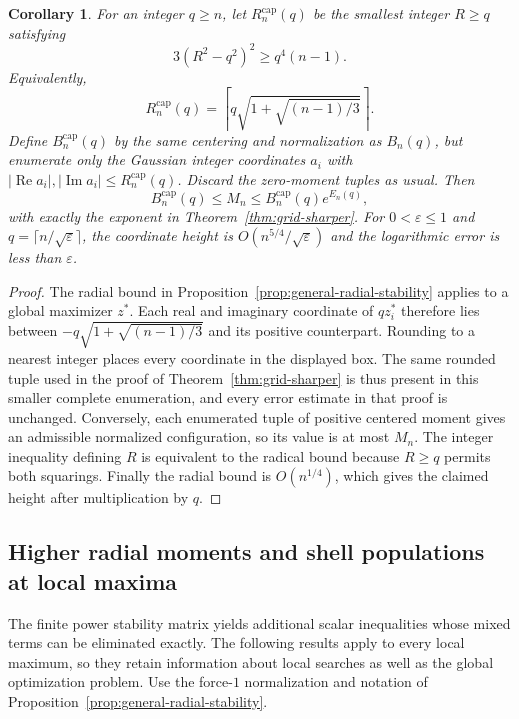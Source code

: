 \documentclass[11pt]{article}
\newtheorem{corollary}[theorem]{Corollary}
\theoremstyle{remark}
\numberwithin{equation}{section}
\begin{document}
\begin{corollary}\label{cor:radius-capped-grid}
For an integer $q\ge n$, let $R_n^{\mathrm{cap}}(q)$ be the smallest
integer $R\ge q$ satisfying
\[
 3(R^2-q^2)^2\ge q^4(n-1).
\]
Equivalently,
\[
 R_n^{\mathrm{cap}}(q)
 =\left\lceil q\sqrt{1+\sqrt{(n-1)/3}}\right\rceil.
\]
Define $B_n^{\mathrm{cap}}(q)$ by the same centering and normalization
as $B_n(q)$, but enumerate only the Gaussian integer coordinates
$a_i$ with
$|\operatorname{Re}a_i|,|\operatorname{Im}a_i|
 \le R_n^{\mathrm{cap}}(q)$.
Discard the zero-moment tuples as usual.  Then
\[
 B_n^{\mathrm{cap}}(q)\le M_n
 \le B_n^{\mathrm{cap}}(q)e^{E_n(q)},
\]
with exactly the exponent in Theorem~\ref{thm:grid-sharper}.
For $0<\varepsilon\le1$ and
$q=\lceil n/\sqrt\varepsilon\rceil$, the coordinate height is
$O(n^{5/4}/\sqrt\varepsilon)$ and the logarithmic error is less
than $\varepsilon$.
\end{corollary}

\begin{proof}
The radial bound in Proposition~\ref{prop:general-radial-stability}
applies to a global maximizer $z^*$.  Each real and imaginary
coordinate of $qz_i^*$ therefore lies between
$-q\sqrt{1+\sqrt{(n-1)/3}}$ and its positive counterpart.
Rounding to a nearest integer places every coordinate in the
displayed box.  The same rounded tuple used in the proof of
Theorem~\ref{thm:grid-sharper} is thus present in this smaller
complete enumeration, and every error estimate in that proof is
unchanged.  Conversely, each enumerated tuple of positive centered
moment gives an admissible normalized configuration, so its value
is at most $M_n$.  The integer inequality defining $R$ is equivalent
to the radical bound because $R\ge q$ permits both squarings.
Finally the radial bound is $O(n^{1/4})$, which gives the claimed
height after multiplication by $q$.
\end{proof}

\subsection{Higher radial moments and shell populations at local maxima}

The finite power stability matrix yields additional scalar inequalities
whose mixed terms can be eliminated exactly.  The following results
apply to every local maximum, so they retain information about local
searches as well as the global optimization problem.  Use the force-$1$
normalization and notation of Proposition~\ref{prop:general-radial-stability}.
\end{document}
